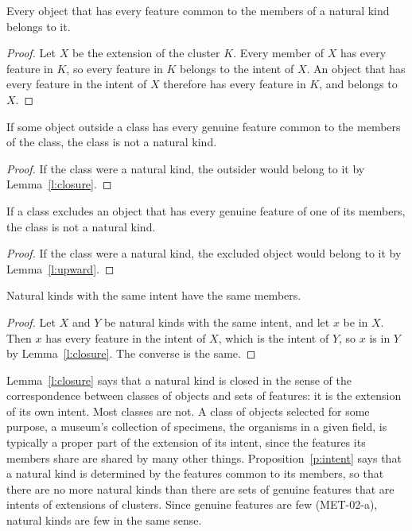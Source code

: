 \documentclass{situationist-preprint}
\begin{document}
\begin{lemma}[Closure]\label{l:closure}
Every object that has every feature common to the members of a natural kind belongs to it.
\end{lemma}

\begin{proof}
Let $X$ be the extension of the cluster $K$. Every member of $X$ has every feature in $K$, so every feature in $K$ belongs to the intent of $X$. An object that has every feature in the intent of $X$ therefore has every feature in $K$, and belongs to $X$.
\end{proof}

\begin{theorem}\label{t:outsider}
If some object outside a class has every genuine feature common to the members of the class, the class is not a natural kind.
\end{theorem}

\begin{proof}
If the class were a natural kind, the outsider would belong to it by Lemma~\ref{l:closure}.
\end{proof}

\begin{corollary}\label{c:privative}
If a class excludes an object that has every genuine feature of one of its members, the class is not a natural kind.
\end{corollary}

\begin{proof}
If the class were a natural kind, the excluded object would belong to it by Lemma~\ref{l:upward}.
\end{proof}

\begin{proposition}\label{p:intent}
Natural kinds with the same intent have the same members.
\end{proposition}

\begin{proof}
Let $X$ and $Y$ be natural kinds with the same intent, and let $x$ be in $X$. Then $x$ has every feature in the intent of $X$, which is the intent of $Y$, so $x$ is in $Y$ by Lemma~\ref{l:closure}. The converse is the same.
\end{proof}

Lemma~\ref{l:closure} says that a natural kind is closed in the sense of the correspondence between classes of objects and sets of features: it is the extension of its own intent. Most classes are not. A class of objects selected for some purpose, a museum's collection of specimens, the organisms in a given field, is typically a proper part of the extension of its intent, since the features its members share are shared by many other things. Proposition~\ref{p:intent} says that a natural kind is determined by the features common to its members, so that there are no more natural kinds than there are sets of genuine features that are intents of extensions of clusters. Since genuine features are few (MET-02-a), natural kinds are few in the same sense.
\end{document}
